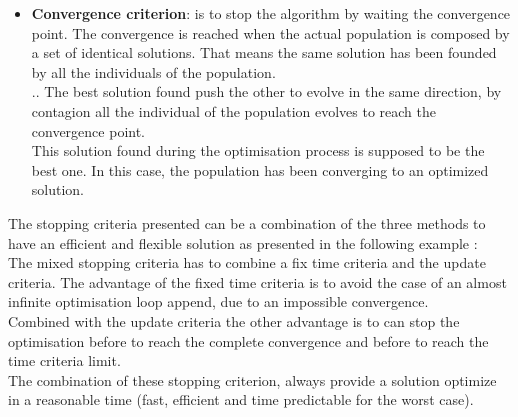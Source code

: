 \begin{itemize}
\item \textbf{Convergence criterion}: is to stop the algorithm by waiting the convergence point. The convergence is reached when the actual population is composed by a set of identical solutions. That means the same solution has been founded by all the individuals of the population. \\..
 The best solution found push the other to evolve in the same direction, by contagion all the individual of the population evolves to reach the convergence point. \\ 
 This solution found during the optimisation process is supposed to be the best one. In this case, the population has been converging to an optimized solution.%
\end{itemize}

 The stopping criteria presented can be a combination of the three methods to have an efficient and flexible solution as presented in the following example :\\
The mixed stopping criteria has to combine a fix time criteria and the update criteria.
The advantage of the fixed time criteria is to avoid the case of an almost infinite optimisation loop append, due to an impossible convergence.%
\\ %
Combined with the update criteria the other advantage is to can stop the optimisation before to reach the complete convergence and before to reach the time criteria limit.\\
The combination of these stopping criterion, always provide a solution optimize in a reasonable time (fast, efficient and time predictable for the worst case). 

 
%



